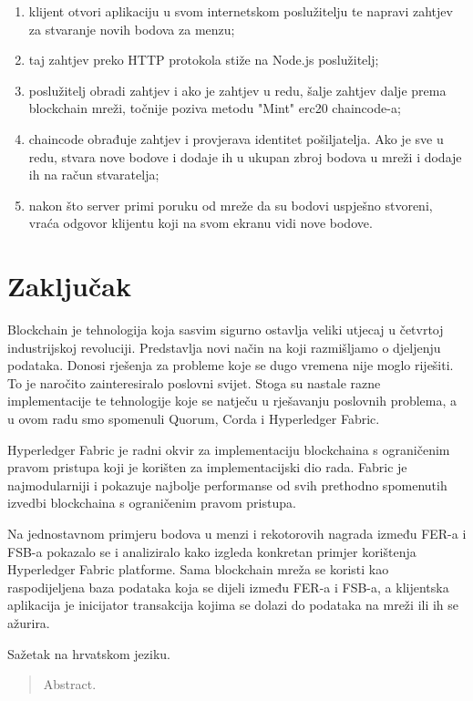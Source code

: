\documentclass[times, utf8, diplomski]{fer}
\begin{document}
\begin{enumerate}
\item klijent otvori aplikaciju u svom internetskom poslužitelju te napravi zahtjev za stvaranje novih bodova za menzu;
\item taj zahtjev preko HTTP protokola stiže na Node.js poslužitelj;
\item poslužitelj obradi zahtjev i ako je zahtjev u redu, šalje zahtjev dalje prema blockchain mreži, točnije poziva metodu "Mint" erc20 chaincode-a;
\item chaincode obrađuje zahtjev i provjerava identitet pošiljatelja. Ako je sve u redu, stvara nove bodove i dodaje ih u ukupan zbroj bodova u mreži i dodaje ih na račun stvaratelja;
\item nakon što server primi poruku od mreže da su bodovi uspješno stvoreni, vraća odgovor klijentu koji na svom ekranu vidi nove bodove.
\end{enumerate}


\chapter{Zaključak}
Blockchain je tehnologija koja sasvim sigurno ostavlja veliki utjecaj u četvrtoj industrijskoj revoluciji. Predstavlja novi način na koji razmišljamo o djeljenju podataka. Donosi rješenja za probleme koje se dugo vremena nije moglo riješiti. To je naročito zainteresiralo poslovni svijet.  Stoga su nastale razne implementacije te tehnologije koje se natječu u rješavanju poslovnih problema, a u ovom radu smo spomenuli Quorum, Corda i Hyperledger Fabric. 

Hyperledger Fabric je radni okvir za implementaciju blockchaina s ograničenim pravom pristupa koji je korišten za implementacijski dio rada. Fabric je najmodularniji i pokazuje najbolje performanse od svih prethodno spomenutih izvedbi blockchaina s ograničenim pravom pristupa.

Na jednostavnom primjeru bodova u menzi i rekotorovih nagrada između FER-a i FSB-a pokazalo se i analiziralo kako izgleda konkretan primjer korištenja Hyperledger Fabric platforme. Sama blockchain mreža se koristi kao raspodijeljena baza podataka koja se dijeli između FER-a i FSB-a, a klijentska aplikacija je inicijator transakcija kojima se dolazi do podataka na mreži ili ih se ažurira. 





\begin{sazetak}
Sažetak na hrvatskom jeziku.

\end{sazetak}

\begin{abstract}
Abstract.

\end{abstract}
\end{document}
